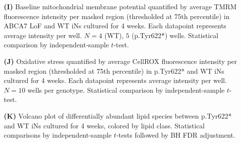 \documentclass[12pt]{article}
\begin{document}
\begin{itemize}
    \item[\textbf{(I)}] Baseline mitochondrial membrane potential quantified by average TMRM fluorescence intensity per masked region (thresholded at 75th percentile) in ABCA7 LoF and WT iNs cultured for 4 weeks. Each datapoint represents average intensity per well. $N=4$ (WT), $5$ (p.Tyr622*) wells. Statistical comparison by independent-sample $t$-test.
    \item[\textbf{(J)}] Oxidative stress quantified by average CellROX fluorescence intensity per masked region (thresholded at 75th percentile) in p.Tyr622* and WT iNs cultured for 4 weeks. Each datapoint represents average intensity per well. $N=10$ wells per genotype. Statistical comparison by independent-sample $t$-test.
    \item[\textbf{(K)}] Volcano plot of differentially abundant lipid species between p.Tyr622* and WT iNs cultured for 4 weeks, colored by lipid class. Statistical comparisons by independent-sample $t$-tests followed by BH FDR adjustment.
\end{itemize}
 \clearpage
\end{document}
